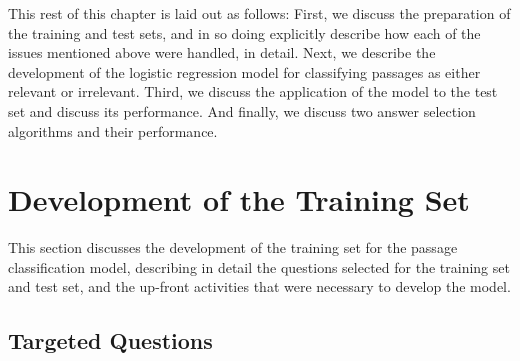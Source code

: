 
This rest of this chapter is laid out as follows:  First, we discuss the preparation of the training and test sets, and in so doing explicitly describe how each of the issues mentioned above were handled, in detail.  Next, we describe the development of the logistic regression model for classifying passages as either relevant or irrelevant.  Third, we discuss the application of the model to the test set and discuss its performance.  And finally, we discuss two answer selection algorithms and their performance.





\section{Development of the Training Set}

This section discusses the development of the training set for the passage classification model, describing in detail the questions selected for the training set and test set, and the up-front activities that were necessary to develop the model.


\subsection{Targeted Questions}

